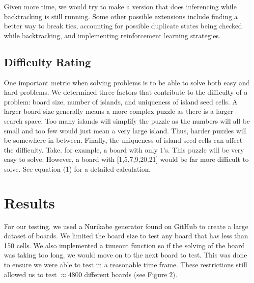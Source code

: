\documentclass{article}
\theoremstyle{definition}
\begin{document}
Given more time, we would try to make a version that does inferencing while backtracking is still running. Some other possible extensions include finding a better way to break ties, accounting for possible duplicate states being checked while backtracking, and implementing reinforcement learning strategies.

\subsection{Difficulty Rating}
One important metric when solving problems is to be able to solve both easy and hard problems. We determined three factors that contribute to the difficulty of a problem: board size, number of islands, and uniqueness of island seed cells. A larger board size generally means a more complex puzzle as there is a larger search space. Too many islands will simplify the puzzle as the numbers will all be small and too few would just mean a very large island. Thus, harder puzzles will be somewhere in between. Finally, the uniqueness of island seed cells can affect the difficulty. Take, for example, a board with only 1's. This puzzle will be very easy to solve. However, a board with [1,5,7,9,20,21] would be far more difficult to solve. See equation (1) for a detailed calculation.


\section{Results}

For our testing, we used a Nurikabe generator found on GitHub \cite{Malorn} to create a large dataset of boards. We limited the board size to test any board that has less than 150 cells. We also implemented a timeout function so if the solving of the board was taking too long, we would move on to the next board to test. This was done to ensure we were able to test in a reasonable time frame. These restrictions still allowed us to test $\approx 4800$ different boards (see Figure 2).
\end{document}

